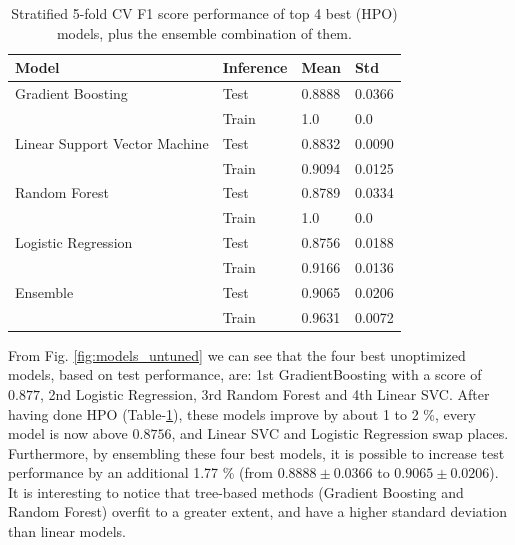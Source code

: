 \documentclass{IEEEtran}
\begin{document}
\begin{table}[h!]
  \centering
  \begin{tabular}{|l|l|l|l|}
  \hline
  \textbf{Model} & \textbf{Inference} & \textbf{Mean} & \textbf{Std} \\
  \hline
  Gradient Boosting & Test & 0.8888 & 0.0366 \\
   & Train & 1.0 & 0.0 \\
  \hline
  Linear Support Vector Machine & Test & 0.8832 & 0.0090 \\
   & Train & 0.9094 & 0.0125 \\
  \hline
  Random Forest & Test & 0.8789 & 0.0334 \\
   & Train & 1.0 & 0.0 \\
  \hline
  Logistic Regression & Test & 0.8756 & 0.0188 \\
   & Train & 0.9166 & 0.0136 \\
  \hline
  Ensemble & Test & 0.9065 & 0.0206 \\
   & Train & 0.9631 & 0.0072 \\
  \hline
  \end{tabular}
  \caption{Stratified 5-fold CV F1 score performance of top 4 best (HPO) models, plus the ensemble combination of them.}
  \label{tab:best_model_scores}
\end{table}

From Fig. \ref{fig:models_untuned} we can see that the four best unoptimized models, based on test performance, are: 1st GradientBoosting with a score of $0.877$, 2nd Logistic Regression, 3rd Random Forest and 4th Linear SVC. After having done HPO (Table-\ref{tab:best_model_scores}), these models improve by about 1 to 2 \%, every model is now above $0.8756$, and Linear SVC and Logistic Regression swap places. Furthermore, by ensembling these four best models, it is possible to increase test performance by an additional  1.77 \% (from $0.8888 \pm 0.0366$ to $0.9065 \pm 0.0206$).
It is interesting to notice that tree-based methods (Gradient Boosting and Random Forest) overfit to a greater extent, and have a higher standard deviation than linear models.
\end{document}
